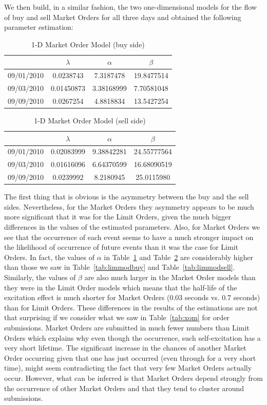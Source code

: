We then build, in a similar fashion, the two one-dimensional models for the flow of buy and sell Market Orders for all three days and obtained the following parameter estimation: 
	\begin{table}[!ht]
	\centering
	\caption{1-D Market Order Model (buy side) \label{tab:marketorderbuy}}
	\begin{tabular}{c|ccc} 
		& $\lambda$ & $\alpha$ & $\beta$ \\ \hline
	09/01/2010 & 0.0238743 & 7.3187478 & 19.8477514 \\
	09/03/2010 & 0.01450873 & 3.38168999 & 7.70581048 \\
	09/09/2010 & 0.0267254 & 4.8818834 & 13.5427254
	\end{tabular}
	\end{table}
	\begin{table}[!ht]
	\centering
	\caption{1-D Market Order Model (sell side) \label{fig:marketordersell}}
	\begin{tabular}{c|ccc} 
		& $\lambda$ & $\alpha$  & $\beta$ \\ \hline
	09/01/2010 & 0.02083999 & 9.38842281 & 24.55777564 \\
	09/03/2010 & 0.01616096 & 6.64370599 & 16.68090519 \\
	09/09/2010 & 0.0239992 & 8.2180945 & 25.0115980
	\end{tabular}
	\end{table}
The first thing that is obvious is the asymmetry between the buy and the sell sides. Nevertheless, for the Market Orders they asymmetry appears to be much more significant that it was for the Limit Orders, given the much bigger differences in the values of the estimated parameters. Also, for Market Orders we see that the occurrence of each event seems to have a much stronger impact on the likelihood of occurrence of future events than it was the case for Limit Orders. In fact, the values of $\alpha$ in Table~\ref{tab:marketorderbuy} and Table~\ref{fig:marketordersell} are considerably higher than those we saw in Table~\ref{tab:limmodbuy} and Table~\ref{tab:limmodsell}. Similarly, the values of $\beta$ are also much larger in the Market Order models than they were in the Limit Order models which means that the half-life of the excitation effect is much shorter for Market Orders (0.03 seconds vs. 0.7 seconds) than for Limit Orders. These differences in the results of the estimations are not that surprising if we consider what we saw in Table~\ref{tab:xom} for order submissions. Market Orders are submitted in much fewer numbers than Limit Orders which explains why even though the occurrence, such self-excitation has a very short lifetime. The significant increase in the chances of another Market Order occurring given that one has just occurred (even through for a very short time), might seem contradicting the fact that very few Market Orders actually occur. However, what can be inferred is that Market Orders depend strongly from the occurrence of other Market Orders and that they tend to cluster around submissions. 



